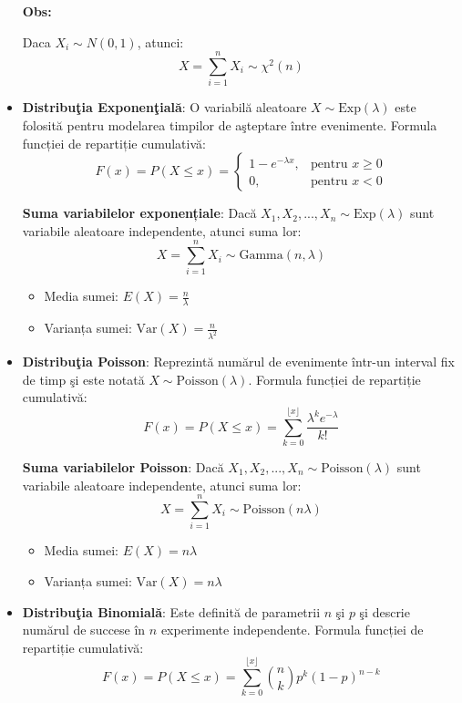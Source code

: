 \documentclass[a4paper,11pt]{article}
\begin{document}
\begin{itemize}
  \textbf{Obs:}

  Daca $X_i \sim N(0,1)$, atunci:
  \[
  X = \sum_{i=1}^{n} X_i \sim \chi^2(n)
  \]

  \item \textbf{Distribu\c{t}ia Exponen\c{t}ial\u{a}}: O variabil\u{a} aleatoare $X \sim \text{Exp}(\lambda)$ este folosit\u{a} pentru modelarea timpilor de a\c{s}teptare între evenimente.
  \newline
  Formula funcției de repartiție cumulativă:
  \[
  F(x) = P(X \leq x) = 
  \begin{cases}
  1 - e^{-\lambda x}, & \text{pentru } x \geq 0 \\
  0, & \text{pentru } x < 0
  \end{cases}
  \]

  \textbf{Suma variabilelor exponențiale}:  
  Dacă $X_1, X_2, ..., X_n \sim \text{Exp}(\lambda)$ sunt variabile aleatoare independente, atunci suma lor:
  \[
  X = \sum_{i=1}^{n} X_i \sim \text{Gamma}(n, \lambda)
  \]
  \begin{itemize}
    \item Media sumei: $E(X) = \frac{n}{\lambda}$
    \item Varianța sumei: $\text{Var}(X) = \frac{n}{\lambda^2}$
  \end{itemize}

  \item \textbf{Distribu\c{t}ia Poisson}: Reprezint\u{a} num\u{a}rul de evenimente într-un interval fix de timp \c{s}i este notat\u{a} $X \sim \text{Poisson}(\lambda)$.
  \newline
  Formula funcției de repartiție cumulativă:
  \[
  F(x) = P(X \leq x) = \sum_{k=0}^{\lfloor x \rfloor} \frac{\lambda^k e^{-\lambda}}{k!}
  \]

  \textbf{Suma variabilelor Poisson}:  
  Dacă $X_1, X_2, ..., X_n \sim \text{Poisson}(\lambda)$ sunt variabile aleatoare independente, atunci suma lor:
  \[
  X = \sum_{i=1}^{n} X_i \sim \text{Poisson}(n\lambda)
  \]
  \begin{itemize}
    \item Media sumei: $E(X) = n\lambda$
    \item Varianța sumei: $\text{Var}(X) = n\lambda$
  \end{itemize}

  \item \textbf{Distribu\c{t}ia Binomial\u{a}}: Este definit\u{a} de parametrii $n$ \c{s}i $p$ \c{s}i descrie num\u{a}rul de succese în $n$ experimente independente.
  \newline
  Formula funcției de repartiție cumulativă:
  \[
  F(x) = P(X \leq x) = \sum_{k=0}^{\lfloor x \rfloor} \binom{n}{k} p^k (1 - p)^{n - k}
  \]


\end{itemize}
\end{document}

